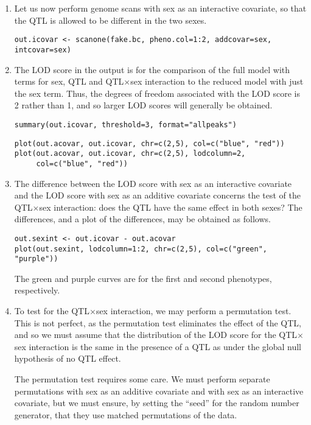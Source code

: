 \documentclass[10pt,letterpaper]{article}
\newcommand{\usercolor}{\color [named]{BlueViolet}}
\begin{document}
\begin{enumerate}
\item Let us now perform genome scans with sex as an interactive
  covariate, so that the QTL is allowed to be different in the two sexes.

\usercolor
\verb|out.icovar <- scanone(fake.bc, pheno.col=1:2, addcovar=sex, intcovar=sex)|
\normalcolor

\item The LOD score in the output is for the comparison of the full
  model with terms for sex, QTL and QTL$\times$sex interaction to the reduced
  model with just the sex term.  Thus, the degrees of freedom
  associated with the LOD score is 2 rather than 1, and so larger LOD
  scores will generally be obtained.

\usercolor
\verb|summary(out.icovar, threshold=3, format="allpeaks")|
\normalcolor

\usercolor
\verb|plot(out.acovar, out.icovar, chr=c(2,5), col=c("blue", "red"))| \\
\verb|plot(out.acovar, out.icovar, chr=c(2,5), lodcolumn=2,| \\
\verb|     col=c("blue", "red"))|
\normalcolor

\item The difference between the LOD score with sex as an interactive
  covariate and the LOD score with sex as an additive covariate
  concerns the test of the QTL$\times$sex interaction: does the QTL
  have the same effect in both sexes?  The differences, and a plot of
  the differences, may be obtained as follows.

\usercolor
\verb|out.sexint <- out.icovar - out.acovar| \\
\verb|plot(out.sexint, lodcolumn=1:2, chr=c(2,5), col=c("green", "purple"))|
\normalcolor

The green and purple curves are for the first and second phenotypes,
respectively.  

\item To test for the QTL$\times$sex interaction, we may perform a
  permutation test.  This is not perfect, as the permutation test
  eliminates the effect of the QTL, and so we must assume that the
  distribution of the LOD score for the QTL$\times$sex interaction is
  the same in the presence of a QTL as under the global null
  hypothesis of no QTL effect.

  The permutation test requires some care.  We must perform
  separate permutations with sex as an additive covariate and with sex
  as an interactive covariate, but we must ensure, by setting the
  ``seed'' for the random number generator, that they use matched
  permutations of the data.


\end{enumerate}
\end{document}
